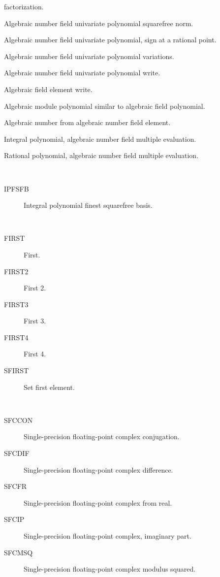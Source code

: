 \begin{description}
\begin{description}
    factorization.
  \item[AFUPSFN]  Algebraic number field univariate polynomial squarefree
    norm.
  \item[AFUPSR]  Algebraic number field univariate polynomial, sign at a
    rational point.
  \item[AFUPVAR]  Algebraic number field univariate polynomial variations.
  \item[AFUPWRITE]  Algebraic number field univariate polynomial write.
  \item[AFWRITE]  Algebraic field element write.
  \item[AMPSAFP]  Algebraic module polynomial similar to algebraic field
    polynomial.
  \item[ANFAF]  Algebraic number from algebraic number field element.
  \item[IPAFME]  Integral polynomial, algebraic number field multiple
    evaluation.
  \item[RPAFME]  Rational polynomial, algebraic number field multiple
    evaluation.
  \end{description}
\item[finest] \ \ 
  \begin{description}
  \item[IPFSFB]  Integral polynomial finest squarefree basis.
  \end{description}
\item[first] \ \ 
  \begin{description}
  \item[FIRST]  First.
  \item[FIRST2]  First 2.
  \item[FIRST3]  First 3.
  \item[FIRST4]  First 4.
  \item[SFIRST]  Set first element.
  \end{description}
\item[floating] \ \ 
  \begin{description}
  \item[SFCCON]  Single-precision floating-point complex conjugation.
  \item[SFCDIF]  Single-precision floating-point complex difference.
  \item[SFCFR]  Single-precision floating-point complex from real.
  \item[SFCIP]  Single-precision floating-point complex, imaginary part.
  \item[SFCMSQ]  Single-precision floating-point complex modulus squared.

\end{description}
\end{description}
